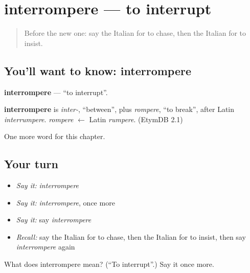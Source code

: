 \section[interrompere]{interrompere — to interrupt}

\label{lesson:IT-C183-interrompere}



\begin{quote}
Before the new one: say the Italian for to chase, then the Italian for to insist.
\end{quote}

\subsection*{You'll want to know: interrompere}
\textbf{interrompere} — \textquotedblleft{}to interrupt\textquotedblright{}.

\begin{cousinweb}
\textbf{interrompere} is \emph{inter-}, \textquotedblleft{}between\textquotedblright{}, plus \emph{rompere}, \textquotedblleft{}to break\textquotedblright{}, after Latin \emph{interrumpere}. \emph{rompere} $\leftarrow$ Latin \emph{rumpere}. (EtymDB 2.1)
\end{cousinweb}

\begin{grammarlens}[title={What you've built}]
One more word for this chapter.
\end{grammarlens}

\subsection*{Your turn}
\begin{itemize}
\raggedright
  \item \emph{Say it:} \emph{interrompere}
  \item \emph{Say it:} \emph{interrompere}, once more
  \item \emph{Say it:} say \emph{interrompere}
  \item \emph{Recall:} say the Italian for to chase, then the Italian for to insist, then say \emph{interrompere} again
\end{itemize}

\begin{tcolorbox}[breakable,colback=teal!4,colframe=teal!35!black,title={Before you move on}]
What does interrompere mean? (\textquotedblleft{}To interrupt\textquotedblright{}.) Say it once more.
\end{tcolorbox}
